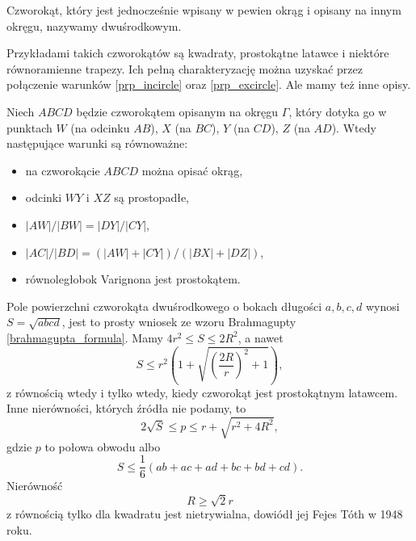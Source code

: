 \begin{definition}
	Czworokąt, który jest jednocześnie wpisany w pewien okrąg i opisany na innym okręgu, nazywamy dwuśrodkowym.
\end{definition}

Przykładami takich czworokątów są kwadraty, prostokątne latawce i niektóre równoramienne trapezy.
Ich pełną charakteryzację można uzyskać przez połączenie warunków \ref{prp_incircle} oraz \ref{prp_excircle}.
Ale mamy też inne opisy.

\begin{proposition}
	Niech $ABCD$ będzie czworokątem opisanym na okręgu $\Gamma$, który dotyka go w punktach $W$ (na odcinku $AB$), $X$ (na $BC$), $Y$ (na $CD$), $Z$ (na $AD$).
	Wtedy następujące warunki są równoważne:
	\begin{itemize}
		\item na czworokącie $ABCD$ można opisać okrąg,
		\item odcinki $WY$ i $XZ$ są prostopadłe,
		\item $|AW|/|BW| = |DY|/|CY|$,
		\item $|AC|/|BD| = (|AW| + |CY|) / (|BX| + |DZ|)$,
		\item równoległobok Varignona jest prostokątem.
	\end{itemize}
\end{proposition}


Pole powierzchni czworokąta dwuśrodkowego o bokach długości $a, b, c, d$ wynosi $S = \sqrt{abcd}$, jest to prosty wniosek ze wzoru Brahmagupty \ref{brahmagupta_formula}.
Mamy $4r^2 \le S \le 2R^2$, a nawet
\begin{equation}
	S \le r^2 \left(1 + \sqrt{\left(\frac{2R}{r}\right)^2 + 1} \right),
\end{equation}
z równością wtedy i tylko wtedy, kiedy czworokąt jest prostokątnym latawcem.
Inne nierówności, których źródła nie podamy, to
\begin{equation}
	2 \sqrt {S} \le p \le r + \sqrt{r^2 + 4R^2},
\end{equation}
gdzie $p$ to połowa obwodu albo 
\begin{equation}
	S \le \frac 1 6 \left(ab + ac + ad + bc + bd + cd\right).
\end{equation}
Nierówność
\begin{equation}
	R \ge \sqrt 2 r
\end{equation}
z równością tylko dla kwadratu jest nietrywialna, dowiódł jej Fejes Tóth w 1948 roku.

